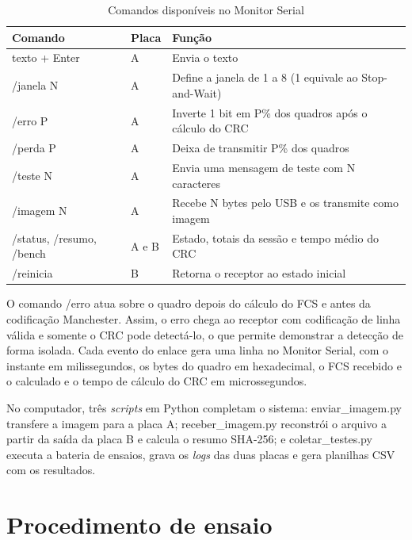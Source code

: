 \documentclass[12pt, oneside, a4paper, sumario=tradicional, chapter=TITLE, brazilian]{abntex2}
\renewcommand{\arraystretch}{1.3}
\begin{document}
\begin{table}[H]
  \centering
  \caption{Comandos disponíveis no Monitor Serial}
  \small\renewcommand{\arraystretch}{1.3}
  \begin{tabular}{|>{\raggedright\arraybackslash}m{4.21cm}|>{\centering\arraybackslash}m{1.83cm}|>{\centering\arraybackslash}m{8.61cm}|}
  \hline
  \rowcolor{gray!22}\textbf{Comando} & \textbf{Placa} & \textbf{Função} \\ \hline
  texto + Enter & A & Envia o texto \\ \hline
  /janela N & A & Define a janela de 1 a 8 (1 equivale ao Stop-and-Wait) \\ \hline
  /erro P & A & Inverte 1 bit em P\% dos quadros após o cálculo do CRC \\ \hline
  /perda P & A & Deixa de transmitir P\% dos quadros \\ \hline
  /teste N & A & Envia uma mensagem de teste com N caracteres \\ \hline
  /imagem N & A & Recebe N bytes pelo USB e os transmite como imagem \\ \hline
  /status, /resumo, /bench & A e B & Estado, totais da sessão e tempo médio do CRC \\ \hline
  /reinicia & B & Retorna o receptor ao estado inicial \\ \hline
  \end{tabular}
\end{table}

O comando /erro atua sobre o quadro depois do cálculo do FCS e antes da codificação Manchester. Assim, o erro chega ao receptor com codificação de linha válida e somente o CRC pode detectá-lo, o que permite demonstrar a detecção de forma isolada. Cada evento do enlace gera uma linha no Monitor Serial, com o instante em milissegundos, os bytes do quadro em hexadecimal, o FCS recebido e o calculado e o tempo de cálculo do CRC em microssegundos.

No computador, três \textit{scripts} em Python completam o sistema: enviar\_imagem.py transfere a imagem para a placa A; receber\_imagem.py reconstrói o arquivo a partir da saída da placa B e calcula o resumo SHA-256; e coletar\_testes.py executa a bateria de ensaios, grava os \textit{logs} das duas placas e gera planilhas CSV com os resultados.

\section{Procedimento de ensaio}
\end{document}

